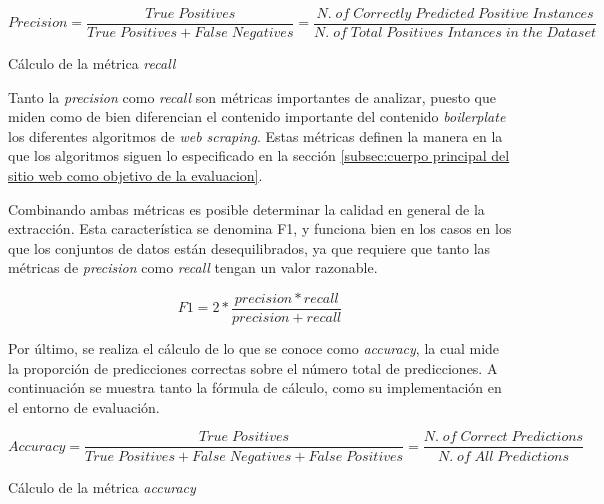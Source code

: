 \begin{equation*}
  Precision = \frac{True\;Positives}{True\;Positives + False\;Negatives} = 
  \frac{N.\;of\;Correctly\;Predicted\;Positive\;Instances}{N.\;of\;Total\;Positives\;Intances\;in\;the\;Dataset}
\end{equation*}

\begin{codefloat}
  
  \caption{Cálculo de la métrica \emph{recall}}
  \label{cod:calculo de la metrica recall}
\end{codefloat}

Tanto la \emph{precision} como \emph{recall} son métricas importantes de analizar, puesto que miden como
de bien diferencian el contenido importante del contenido \emph{boilerplate} los diferentes algoritmos de
\emph{web scraping}. Estas métricas definen la manera en la que los algoritmos siguen lo especificado en
la sección \ref{subsec:cuerpo principal del sitio web como objetivo de la evaluacion}.

Combinando ambas métricas es posible determinar la calidad en general de la extracción. Esta característica
se denomina F1, y funciona bien en los casos en los que los conjuntos de datos están desequilibrados,
ya que requiere que tanto las métricas de \emph{precision} como \emph{recall} tengan un valor razonable.

\begin{equation*}
  F1 = 2 * \frac{precision * recall}{precision + recall}
\end{equation*}

Por último, se realiza el cálculo de lo que se conoce como \emph{accuracy}, la cual mide la proporción de
predicciones correctas sobre el número total de predicciones. A continuación se muestra tanto la fórmula
de cálculo, como su implementación en el entorno de evaluación.

\begin{equation*}
  Accuracy = \frac{True\;Positives}{True\;Positives + False\;Negatives + False\;Positives} = 
  \frac{N.\;of\;Correct\;Predictions}{N.\;of\;All\;Predictions}
\end{equation*}

\begin{codefloat}
  
  \caption{Cálculo de la métrica \emph{accuracy}}
  \label{cod:calculo de la metrica accuracy}
\end{codefloat}

